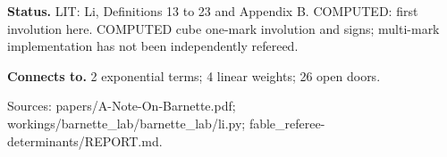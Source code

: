 \textbf{Status.} LIT: Li, Definitions 13 to 23 and Appendix B. COMPUTED: first involution here. COMPUTED cube one-mark involution and signs; multi-mark implementation has not been independently refereed.

\textbf{Connects to.} 2 exponential terms; 4 linear weights; 26 open doors.

{\footnotesize\raggedright Sources: papers/\allowbreak{}A-Note-On-Barnette.pdf;\allowbreak{} workings/\allowbreak{}barnette\_lab/\allowbreak{}barnette\_lab/\allowbreak{}li.py;\allowbreak{} fable\_referee-determinants/\allowbreak{}REPORT.md.\par}
